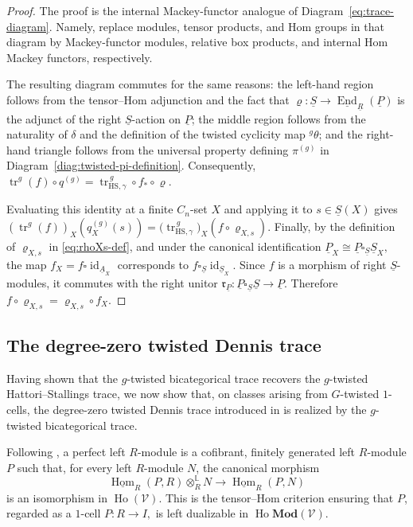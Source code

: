 \documentclass[11pt,oneside]{amsart}
\DeclareMathOperator{\Hom}{Hom}
\DeclareMathOperator{\Ho}{Ho}
\DeclareMathOperator{\End}{End}
\DeclareMathOperator{\id}{id}
\numberwithin{equation}{section}
\numberwithin{figure}{section}
\theoremstyle{plain}
\theoremstyle{definition}
\theoremstyle{remark}
\begin{document}
\begin{proof}
The proof is the internal Mackey-functor analogue of
Diagram~\ref{eq:trace-diagram}. Namely, replace modules, tensor
products, and Hom groups in that diagram by Mackey-functor modules,
relative box products, and internal Hom Mackey functors, respectively.

The resulting diagram commutes for the same  reasons:
the left-hand region follows from the tensor--Hom adjunction and the fact that
\(\varrho\colon\underline S\to
\underline{\End}_{\underline R}(\underline P)\)
is the adjunct of the right \(\underline S\)-action on
\(\underline P\);
the middle region follows from the naturality of \(\delta\) and the
definition of the twisted cyclicity map \({}^g\theta\); and the
right-hand triangle follows from the universal property defining
\(\pi^{(g)}\) in
Diagram~\ref{diag:twisted-pi-definition}. Consequently, \(
\operatorname{tr}^g(f)\circ q^{(g)}
=
\operatorname{tr}_{\mathrm{HS},\gamma}^{\,g}
\circ f_*\circ\varrho.
\)
 

Evaluating this identity at a finite \(C_n\)-set \(X\) and applying it
to \(s\in\underline S(X)\) gives
\(
(\operatorname{tr}^g(f))_X(q_X^{(g)}(s))
=
\bigl(\operatorname{tr}_{\mathrm{HS},\gamma}^{\,g}\bigr)_X
(f\circ\varrho_{X,s}).
\)
Finally, by the definition of \(\varrho_{X,s}\) in \eqref{eq:rhoXs-def}, and
under the canonical identification
\(
\underline P_X\cong \underline P\square_{\underline S}\underline S_X,
\)
the map \(f_X=f\square\id_{\underline A_X}\) corresponds to
\(f\square_{\underline S}\id_{\underline S_X}\). Since \(f\) is a morphism of
right \(\underline S\)-modules, it commutes with the right unitor
\(
\mathfrak r_{\underline P}:
\underline P\square_{\underline S}\underline S\to \underline P.
\)
Therefore
\(
f\circ\varrho_{X,s}
=
\varrho_{X,s}\circ f_X.
\)
\end{proof}
 

\subsection{The degree-zero twisted Dennis trace}

Having shown that the \(g\)-twisted bicategorical trace recovers the
\(g\)-twisted Hattori--Stallings trace, we now show that, on classes
arising from \(G\)-twisted \(1\)-cells, the degree-zero twisted Dennis
trace introduced in \cite[Section~6.1]{AGHKK} is realized by the
\(g\)-twisted bicategorical trace.

 Following \cite[Remark~3.2.11]{AGHKK}, a perfect left $R$-module is a cofibrant, finitely generated left $R$-module $P$ such that, for every left $R$-module $N$, the canonical morphism 
\[
\underline{\Hom}_R(P,R)\otimes_R^{\mathbb L}N
\longrightarrow
\underline{\Hom}_R(P,N)
\]
is an isomorphism in $\Ho(\mathcal V)$. This is the tensor--Hom criterion ensuring that $P$, regarded as a $1$-cell 
\(
P\colon R\to I,
\)
is left dualizable in $\Ho\mathbf{Mod}(\mathcal V)$.
\end{document}
